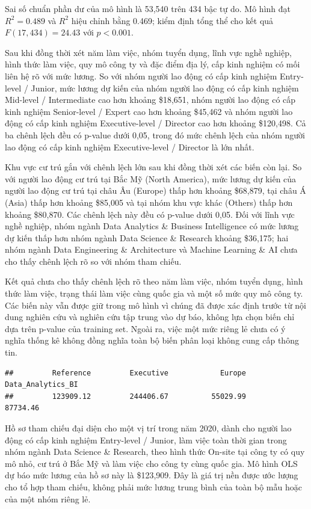 Sai số chuẩn phần dư của mô hình là 53,540 trên 434 bậc tự do.
Mô hình đạt $R^2=0.489$ và $R^2$ hiệu chỉnh bằng 0.469; kiểm định tổng
thể cho kết quả $F(17,434)=24.43$ với $p<0.001$.

Sau khi đồng thời xét năm làm việc, nhóm tuyển dụng, lĩnh vực nghề
nghiệp, hình thức làm việc, quy mô công ty và đặc điểm địa lý, cấp kinh
nghiệm có mối liên hệ rõ với mức lương. So với nhóm người lao động có
cấp kinh nghiệm Entry-level / Junior, mức lương dự kiến của nhóm người
lao động có cấp kinh nghiệm Mid-level / Intermediate cao hơn khoảng
\$18,651, nhóm người lao động có cấp kinh nghiệm Senior-level / Expert
cao hơn khoảng \$45,462 và nhóm người lao động có cấp kinh nghiệm
Executive-level / Director cao hơn khoảng \$120,498. Cả ba chênh lệch
đều có p-value dưới 0,05, trong đó mức chênh lệch của nhóm người lao
động có cấp kinh nghiệm Executive-level / Director là lớn nhất.

Khu vực cư trú gắn với chênh lệch lớn sau khi đồng thời xét các biến còn
lại. So với người lao động cư trú tại Bắc Mỹ (North America), mức lương
dự kiến của người lao động cư trú tại châu Âu (Europe) thấp hơn khoảng
\$68,879, tại châu Á (Asia) thấp hơn khoảng \$85,005 và tại nhóm khu vực
khác (Others) thấp hơn khoảng \$80,870. Các chênh lệch này đều có
p-value dưới 0,05. Đối với lĩnh vực nghề nghiệp, nhóm ngành Data
Analytics \& Business Intelligence có mức lương dự kiến thấp hơn nhóm
ngành Data Science \& Research khoảng \$36,175; hai nhóm ngành Data
Engineering \& Architecture và Machine Learning \& AI chưa cho thấy
chênh lệch rõ so với nhóm tham chiếu.

Kết quả chưa cho thấy chênh lệch rõ theo năm làm việc, nhóm tuyển dụng,
hình thức làm việc, trạng thái làm việc cùng quốc gia và một số mức quy
mô công ty. Các biến này vẫn được giữ trong mô hình vì chúng đã được xác
định trước từ nội dung nghiên cứu và nghiên cứu tập trung vào dự báo,
không lựa chọn biến chỉ dựa trên p-value của training set. Ngoài ra,
việc một mức riêng lẻ chưa có ý nghĩa thống kê không đồng nghĩa toàn bộ
biến phân loại không cung cấp thông tin.

\begin{verbatim}
##         Reference         Executive            Europe Data_Analytics_BI 
##         123909.12         244406.67          55029.99          87734.46
\end{verbatim}

Hồ sơ tham chiếu đại diện cho một vị trí trong năm 2020, dành cho người
lao động có cấp kinh nghiệm Entry-level / Junior, làm việc toàn thời
gian trong nhóm ngành Data Science \& Research, theo hình thức On-site
tại công ty có quy mô nhỏ, cư trú ở Bắc Mỹ và làm việc cho công ty cùng
quốc gia. Mô hình OLS dự báo mức lương của hồ sơ này là \$123,909. Đây
là giá trị nền được ước lượng cho tổ hợp tham chiếu, không phải mức
lương trung bình của toàn bộ mẫu hoặc của một nhóm riêng lẻ.

